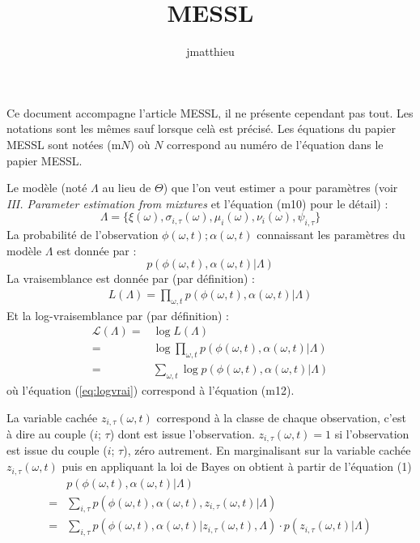 \documentclass[a4paper,12pt]{article}
\title{MESSL}
\author{jmatthieu}
\begin{document}
\maketitle
Ce document accompagne l'article MESSL, il ne présente cependant pas tout. Les notations sont les mêmes sauf lorsque celà est précisé. Les équations du papier MESSL sont notées (m$N$) où $N$ correspond au numéro de l'équation dans le papier MESSL.

Le modèle (noté $\Lambda$ au lieu de $\Theta$) que l'on veut estimer a pour paramètres (voir \textit{III. Parameter estimation from mixtures} et l'équation (m10) pour le détail) :
\begin{equation*}
\Lambda = \{\xi(\omega),\sigma_{i,\tau}(\omega),\mu_{i}(\omega),\nu_i(\omega),\psi_{i,\tau}\}
\end{equation*}
La probabilité de l'observation $\phi(\omega,t) ; \alpha(\omega,t)$ connaissant les paramètres du modèle $\Lambda$ est donnée par :
\begin{equation*}
p(\phi(\omega,t), \alpha(\omega,t) | \Lambda)
\end{equation*}
La vraisemblance est donnée par (par définition) :
\begin{align*}
L(\Lambda) = \displaystyle \prod_{\omega,t} p(\phi(\omega,t), \alpha(\omega,t) | \Lambda)
\end{align*}
Et la log-vraisemblance par (par définition) :
\begin{align}
\mathcal{L}(\Lambda) = & \log L(\Lambda) \nonumber \\
 = & \log \displaystyle \prod_{\omega,t} p(\phi(\omega,t), \alpha(\omega,t) | \Lambda) \nonumber \\
 = & \displaystyle\sum_{\omega,t} \log p(\phi(\omega,t), \alpha(\omega,t) | \Lambda) \label{eq:logvrai}
\end{align}
où l'équation (\ref{eq:logvrai}) correspond à l'équation (m12).

La variable cachée $z_{i,\tau}(\omega,t)$ correspond à la classe de chaque observation, c'est à dire au couple ($i$; $\tau$) dont est issue l'observation. $z_{i,\tau}(\omega,t) = 1$ si l'observation est issue du couple ($i$; $\tau$), zéro autrement. En marginalisant sur la variable cachée $z_{i,\tau}(\omega,t)$ puis en appliquant la loi de Bayes on obtient à partir de l'équation (1)
\begin{align}
& p(\phi(\omega,t), \alpha(\omega,t) | \Lambda)\nonumber \\
= & \displaystyle\sum_{i, \tau} p(\phi(\omega,t), \alpha(\omega,t), z_{i, \tau}(\omega,t) | \Lambda) \nonumber\\
= & \displaystyle\sum_{i, \tau} p(\phi(\omega,t), \alpha(\omega,t) | z_{i, \tau}(\omega,t), \Lambda) \cdot p(z_{i, \tau}(\omega,t) | \Lambda) \label{eq:margi}
\end{align}
\end{document}
